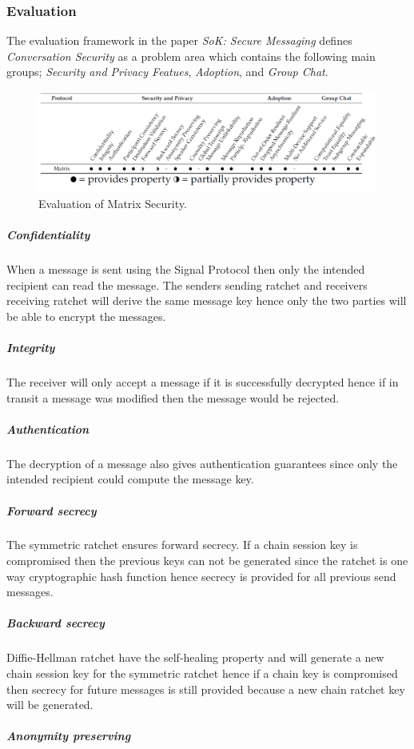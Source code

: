\subsubsection{Evaluation}
The evaluation framework in the paper \emph{SoK: Secure Messaging} defines \emph{Conversation Security} as a problem area which contains the following main groups; \emph{Security and Privacy Featues}, \emph{Adoption}, and \emph{Group Chat}.


\begin{figure}[H]
	\centering
	\includegraphics[width=12cm]{figures/framework.png}
	\caption{Evaluation of Matrix Security.}
	\label{fig:framework}
\end{figure}

\subparagraph{Confidentiality} When a message is sent using the Signal Protocol then only the intended recipient can read the message. The senders sending ratchet and receivers receiving ratchet will derive the same message key hence only the two parties will be able to encrypt the messages. 

\subparagraph{Integrity} The receiver will only accept a message if it is successfully decrypted hence if in transit a message was modified then the message would be rejected.

\subparagraph{Authentication} The decryption of a message also gives authentication guarantees since only the intended recipient could compute the message key.

\subparagraph{Forward secrecy} The symmetric ratchet ensures forward secrecy. If a chain session key is compromised then the previous keys can not be generated since the ratchet is one way cryptographic hash function hence secrecy is provided for all previous send messages.  

\subparagraph{Backward secrecy} Diffie-Hellman ratchet have the self-healing property and will generate a new chain session key for the symmetric ratchet hence if a chain key is compromised then secrecy for future messages is still provided because a new chain ratchet key will be generated.

\subparagraph{Anonymity preserving}

